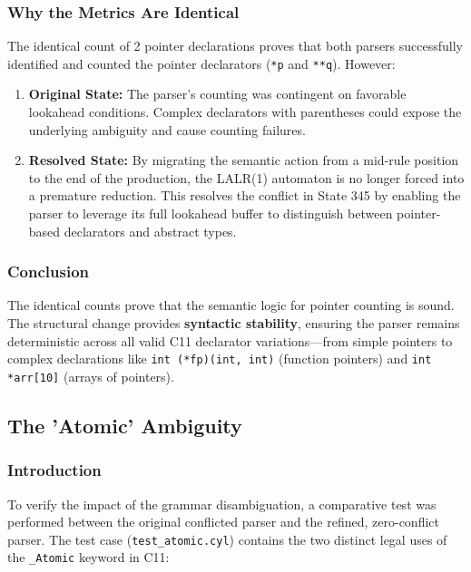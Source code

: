\documentclass[a4paper,12pt]{article}
\begin{document}
\subsubsection{Why the Metrics Are Identical}

The identical count of 2 pointer declarations proves that both parsers successfully identified and counted the pointer declarators (\texttt{*p} and \texttt{**q}). However:

\begin{enumerate}
    \item \textbf{Original State:} The parser's counting was contingent on favorable lookahead conditions. Complex declarators with parentheses could expose the underlying ambiguity and cause counting failures.

    \item \textbf{Resolved State:} By migrating the semantic action from a mid-rule position to the end of the production, the LALR(1) automaton is no longer forced into a premature reduction. This resolves the conflict in State 345 by enabling the parser to leverage its full lookahead buffer to distinguish between pointer-based declarators and abstract types.
\end{enumerate}

\subsubsection{Conclusion}

The identical counts prove that the semantic logic for pointer counting is sound. The structural change provides \textbf{syntactic stability}, ensuring the parser remains deterministic across all valid C11 declarator variations---from simple pointers to complex declarations like \texttt{int (*fp)(int, int)} (function pointers) and \texttt{int *arr[10]} (arrays of pointers).

\newpage

\subsection{The 'Atomic' Ambiguity}
\label{sec:atomic_ambiguity_analysis}

\subsubsection{Introduction}

To verify the impact of the grammar disambiguation, a comparative test was performed between the original conflicted parser and the refined, zero-conflict parser. The test case (\texttt{test\_atomic.cyl}) contains the two distinct legal uses of the \texttt{\_Atomic} keyword in C11:
\end{document}
